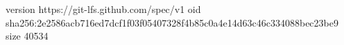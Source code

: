 version https://git-lfs.github.com/spec/v1
oid sha256:2e2586acb716ed7dcf1f03f05407328f4b85c0a4e14d63c46c334088bec23be9
size 40534
